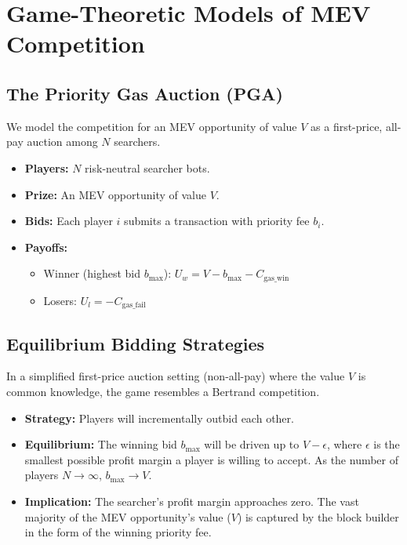 \section{Game-Theoretic Models of MEV Competition}

\subsection{The Priority Gas Auction (PGA)}
We model the competition for an MEV opportunity of value $V$ as a first-price, all-pay auction among $N$ searchers.
\begin{itemize}
    \item \textbf{Players:} $N$ risk-neutral searcher bots.
    \item \textbf{Prize:} An MEV opportunity of value $V$.
    \item \textbf{Bids:} Each player $i$ submits a transaction with priority fee $b_i$.
    \item \textbf{Payoffs:}
        \begin{itemize}
            \item Winner (highest bid $b_{\text{max}}$): $U_w = V - b_{\text{max}} - C_{\text{gas\_win}}$
            \item Losers: $U_l = -C_{\text{gas\_fail}}$
        \end{itemize}
\end{itemize}

\subsection{Equilibrium Bidding Strategies}
In a simplified first-price auction setting (non-all-pay) where the value $V$ is common knowledge, the game resembles a Bertrand competition.
\begin{itemize}
    \item \textbf{Strategy:} Players will incrementally outbid each other.
    \item \textbf{Equilibrium:} The winning bid $b_{\text{max}}$ will be driven up to $V - \epsilon$, where $\epsilon$ is the smallest possible profit margin a player is willing to accept. As the number of players $N \to \infty$, $b_{\text{max}} \to V$.
    \item \textbf{Implication:} The searcher's profit margin approaches zero. The vast majority of the MEV opportunity's value ($V$) is captured by the block builder in the form of the winning priority fee.
\end{itemize}